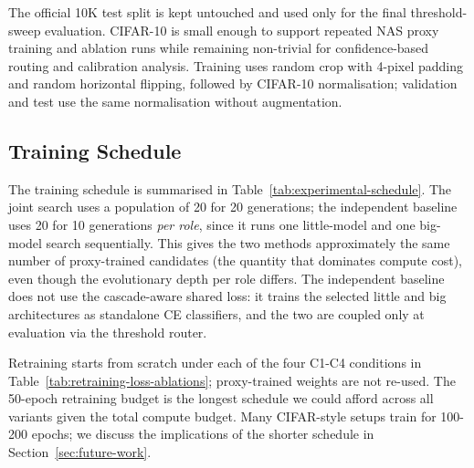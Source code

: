 \documentclass[conference]{IEEEtran}
\begin{document}
The official 10K test split is kept untouched and used only for
the final threshold-sweep evaluation. CIFAR-10 is small enough to support
repeated NAS proxy training and ablation runs while remaining non-trivial
for confidence-based routing and calibration analysis. Training uses
random crop with 4-pixel padding and random horizontal flipping, followed
by CIFAR-10 normalisation; validation and test use the same normalisation
without augmentation.

\subsection{Training Schedule}

The training schedule is summarised in Table~\ref{tab:experimental-schedule}.
The joint search uses a population of 20 for 20 generations; the independent
baseline uses 20 for 10 generations \emph{per role}, since it runs one
little-model and one big-model search sequentially. This gives the two
methods approximately the same number of proxy-trained candidates (the
quantity that dominates compute cost), even though the evolutionary depth
per role differs. The independent baseline does not use the cascade-aware
shared loss: it trains the selected little and big architectures as
standalone CE classifiers, and the two are coupled only at evaluation via
the threshold router.

Retraining starts from scratch under each of the four C1-C4 conditions in
Table~\ref{tab:retraining-loss-ablations}; proxy-trained weights are not
re-used. The 50-epoch retraining budget is the longest schedule we could
afford across all variants given the total compute budget. Many CIFAR-style
setups train for 100-200 epochs; we discuss the implications of the
shorter schedule in Section~\ref{sec:future-work}.
\end{document}
